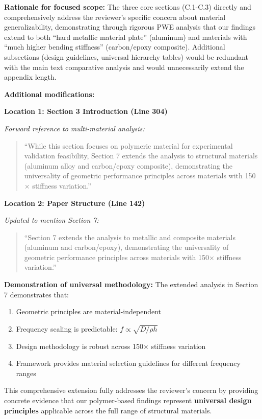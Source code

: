 \documentclass[11pt,a4paper]{article}
\newenvironment{changesbox}{%
    \par\medskip\noindent{\color{changescolor}\rule{\linewidth}{2pt}}\par
    \noindent{\color{changescolor}\bfseries Manuscript Changes}\par\smallskip
}{%
    \par\noindent{\color{changescolor}\rule{\linewidth}{0.5pt}}\medskip
}
\begin{document}
\begin{changesbox}
\textbf{Rationale for focused scope:} The three core sections (C.1-C.3) directly and comprehensively address the reviewer's specific concern about material generalizability, demonstrating through rigorous PWE analysis that our findings extend to both ``hard metallic material plate'' (aluminum) and materials with ``much higher bending stiffness'' (carbon/epoxy composite). Additional subsections (design guidelines, universal hierarchy tables) would be redundant with the main text comparative analysis and would unnecessarily extend the appendix length.

\textbf{Additional modifications:}

\textbf{Location 1: Section 3 Introduction (Line 304)}

\textit{Forward reference to multi-material analysis:}
\begin{quote}
\textcolor{redtext}{``While this section focuses on polymeric material for experimental validation feasibility, Section 7 extends the analysis to structural materials (aluminum alloy and carbon/epoxy composite), demonstrating the universality of geometric performance principles across materials with 150$\times$ stiffness variation.''}
\end{quote}

\textbf{Location 2: Paper Structure (Line 142)}

\textit{Updated to mention Section 7:}
\begin{quote}
\textcolor{redtext}{``Section 7 extends the analysis to metallic and composite materials (aluminum and carbon/epoxy), demonstrating the universality of geometric performance principles across materials with 150$\times$ stiffness variation.''}
\end{quote}
\end{changesbox}

\textbf{Demonstration of universal methodology:} The extended analysis in Section 7 demonstrates that:
\begin{enumerate}
    \item Geometric principles are material-independent
    \item Frequency scaling is predictable: $f \propto \sqrt{D/\rho h}$
    \item Design methodology is robust across 150$\times$ stiffness variation
    \item Framework provides material selection guidelines for different frequency ranges
\end{enumerate}

This comprehensive extension fully addresses the reviewer's concern by providing concrete evidence that our polymer-based findings represent \textbf{universal design principles} applicable across the full range of structural materials.
\end{document}
